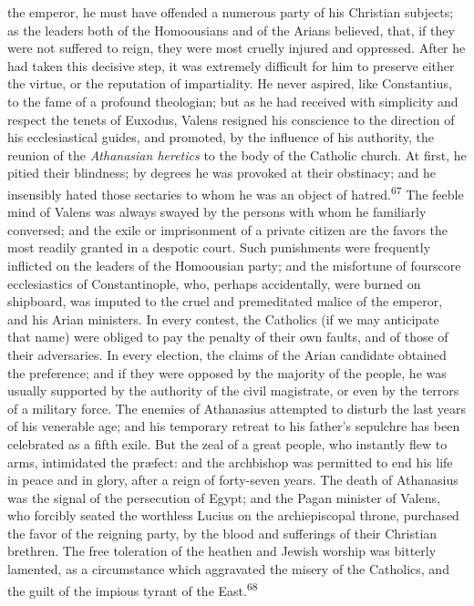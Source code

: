 the emperor, he must have offended a numerous party of his
Christian subjects; as the leaders both of the Homoousians and of
the Arians believed, that, if they were not suffered to reign,
they were most cruelly injured and oppressed. After he had taken
this decisive step, it was extremely difficult for him to
preserve either the virtue, or the reputation of impartiality. He
never aspired, like Constantius, to the fame of a profound
theologian; but as he had received with simplicity and respect
the tenets of Euxodus, Valens resigned his conscience to the
direction of his ecclesiastical guides, and promoted, by the
influence of his authority, the reunion of the \textit{Athanasian
heretics} to the body of the Catholic church. At first, he pitied
their blindness; by degrees he was provoked at their obstinacy;
and he insensibly hated those sectaries to whom he was an object
of hatred.\textsuperscript{67} The feeble mind of Valens was always swayed by the
persons with whom he familiarly conversed; and the exile or
imprisonment of a private citizen are the favors the most readily
granted in a despotic court. Such punishments were frequently
inflicted on the leaders of the Homoousian party; and the
misfortune of fourscore ecclesiastics of Constantinople, who,
perhaps accidentally, were burned on shipboard, was imputed to
the cruel and premeditated malice of the emperor, and his Arian
ministers. In every contest, the Catholics (if we may anticipate
that name) were obliged to pay the penalty of their own faults,
and of those of their adversaries. In every election, the claims
of the Arian candidate obtained the preference; and if they were
opposed by the majority of the people, he was usually supported
by the authority of the civil magistrate, or even by the terrors
of a military force. The enemies of Athanasius attempted to
disturb the last years of his venerable age; and his temporary
retreat to his father’s sepulchre has been celebrated as a fifth
exile. But the zeal of a great people, who instantly flew to
arms, intimidated the præfect: and the archbishop was permitted
to end his life in peace and in glory, after a reign of
forty-seven years. The death of Athanasius was the signal of the
persecution of Egypt; and the Pagan minister of Valens, who
forcibly seated the worthless Lucius on the archiepiscopal
throne, purchased the favor of the reigning party, by the blood
and sufferings of their Christian brethren. The free toleration
of the heathen and Jewish worship was bitterly lamented, as a
circumstance which aggravated the misery of the Catholics, and
the guilt of the impious tyrant of the East.\textsuperscript{68}

